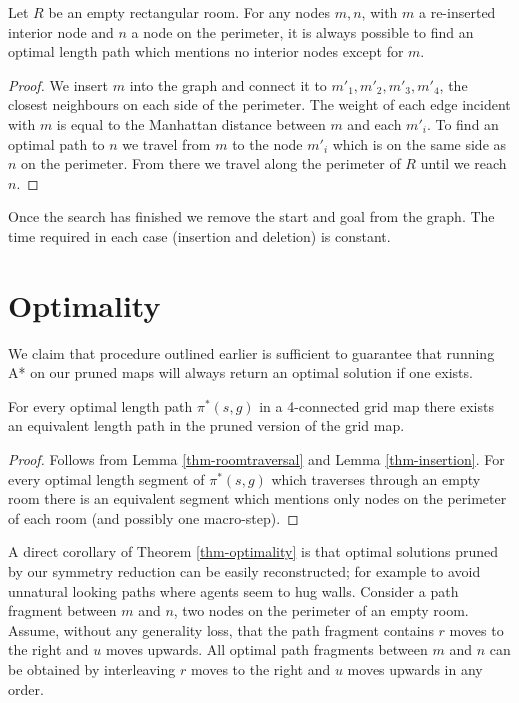\begin{lemma}
\label{thm-insertion}
Let $R$ be an empty rectangular room.
For any nodes $m, n$, with $m$ a re-inserted interior node and $n$ a node on the perimeter,
it is always possible to find an optimal length path which mentions no interior nodes except for $m$.
\end{lemma}
\begin{proof}
We insert $m$ into the graph and connect it to 
$m'_{1}, m'_{2}, m'_{3}, m'_{4}$, the closest neighbours on 
each side of the perimeter.
The weight of each edge incident with $m$ is equal to the Manhattan distance between
$m$ and each $m'_{i}$.
To find an optimal path to $n$ we travel from $m$ to the node $m'_{i}$ which is 
on the same side as $n$ on the perimeter.
From there we travel along the perimeter of $R$ until we reach $n$.
\end{proof}

Once the search has finished we remove the start and goal from the graph.
The time required in each case (insertion and deletion) is constant.

\section{Optimality}
We claim that procedure outlined earlier is sufficient to 
guarantee that running A* on our pruned maps will always return an optimal solution if one exists.

\begin{theorem}
\label{thm-optimality}
For every optimal length path $\pi^*(s, g)$ in a 4-connected grid map there exists
an equivalent length path in the pruned version of the grid map.
\end{theorem}
\begin{proof}
Follows from Lemma \ref{thm-roomtraversal} and Lemma \ref{thm-insertion}.
For every optimal length segment of $\pi^{*}(s, g)$ which traverses
through an empty room there is an equivalent segment which mentions only nodes
on the perimeter of each room (and possibly one macro-step).
\end{proof}

A direct corollary of Theorem \ref{thm-optimality} is that optimal solutions
pruned by our symmetry reduction can be easily reconstructed; for example to
avoid unnatural looking paths where agents seem to hug walls.
Consider a path fragment between $m$ and $n$, two nodes on the perimeter of an empty room.
Assume, without any generality loss, that the path fragment contains $r$ moves to the right and $u$ moves upwards.
All optimal path fragments between $m$ and $n$ can be obtained by interleaving $r$ moves to the right
and $u$ moves upwards in any order.

